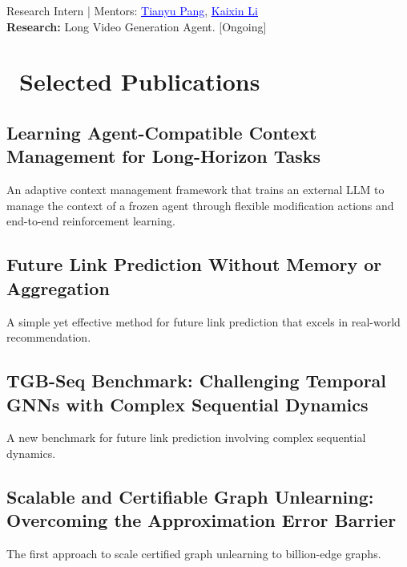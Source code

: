 \documentclass{resume}
\begin{document}
Research Intern | Mentors: \href{https://p2333.github.io/}{\textcolor{blue}{\underline{Tianyu Pang}}}, \href{https://likaixin2000.github.io/}{\textcolor{blue}{\underline{Kaixin Li}}}\\
{\bf Research:} Long Video Generation Agent. [Ongoing]
\section{\faLeanpub\ Selected Publications}

\subsection{\bf Learning Agent-Compatible Context Management for Long-Horizon Tasks}
\par\noindent An adaptive context management framework that trains an external LLM to manage the context of a frozen agent through flexible modification actions and end-to-end reinforcement learning.
\subsection{\bf Future Link Prediction Without Memory or Aggregation}
\par\noindent A simple yet effective method for future link prediction that excels in real-world recommendation.

\subsection{\bf TGB-Seq Benchmark: Challenging Temporal GNNs with Complex Sequential Dynamics}
\par\noindent A new benchmark for future link prediction involving complex sequential dynamics.

\subsection{{\bf Scalable and Certifiable Graph Unlearning: Overcoming the Approximation Error Barrier} }
\par\noindent The first approach to scale certified graph unlearning to billion-edge graphs.
\end{document}
